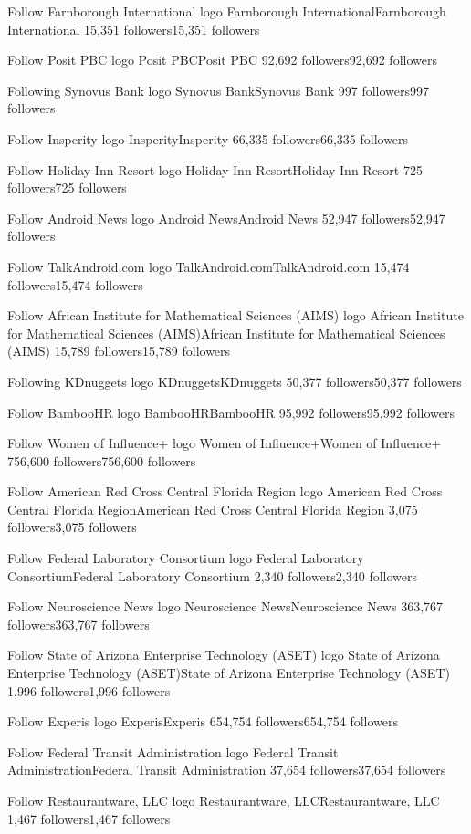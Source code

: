 Follow
Farnborough International logo
Farnborough InternationalFarnborough International
15,351 followers15,351 followers

Follow
Posit PBC logo
Posit PBCPosit PBC
92,692 followers92,692 followers

Following
Synovus Bank logo
Synovus BankSynovus Bank
997 followers997 followers

Follow
Insperity logo
InsperityInsperity
66,335 followers66,335 followers

Follow
Holiday Inn Resort logo
Holiday Inn ResortHoliday Inn Resort
725 followers725 followers

Follow
Android News logo
Android NewsAndroid News
52,947 followers52,947 followers

Follow
TalkAndroid.com logo
TalkAndroid.comTalkAndroid.com
15,474 followers15,474 followers

Follow
African Institute for Mathematical Sciences (AIMS) logo
African Institute for Mathematical Sciences (AIMS)African Institute for Mathematical Sciences (AIMS)
15,789 followers15,789 followers

Following
KDnuggets logo
KDnuggetsKDnuggets
50,377 followers50,377 followers

Follow
BambooHR logo
BambooHRBambooHR
95,992 followers95,992 followers

Follow
Women of Influence+ logo
Women of Influence+Women of Influence+
756,600 followers756,600 followers

Follow
American Red Cross Central Florida Region logo
American Red Cross Central Florida RegionAmerican Red Cross Central Florida Region
3,075 followers3,075 followers

Follow
Federal Laboratory Consortium logo
Federal Laboratory ConsortiumFederal Laboratory Consortium
2,340 followers2,340 followers

Follow
Neuroscience News logo
Neuroscience NewsNeuroscience News
363,767 followers363,767 followers

Follow
State of Arizona Enterprise Technology (ASET) logo
State of Arizona Enterprise Technology (ASET)State of Arizona Enterprise Technology (ASET)
1,996 followers1,996 followers

Follow
Experis logo
ExperisExperis
654,754 followers654,754 followers

Follow
Federal Transit Administration logo
Federal Transit AdministrationFederal Transit Administration
37,654 followers37,654 followers

Follow
Restaurantware, LLC logo
Restaurantware, LLCRestaurantware, LLC
1,467 followers1,467 followers

